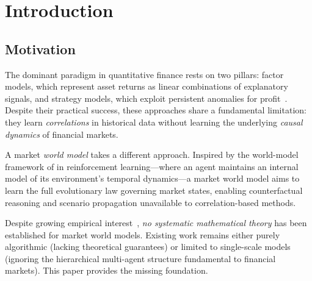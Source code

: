 \documentclass[12pt,a4paper]{article}
\theoremstyle{plain}
\theoremstyle{definition}
\newcommand{\1}{\mathbbm{1}}
\begin{document}
\begin{abstract}
Taken together, these results constitute, to the best of our knowledge,
the \emph{first} systematic mathematical theory for market world models—one
that is simultaneously axiomatically rigorous and computationally realizable:
a self-contained, axiomatically grounded framework that connects the
world-model paradigm of machine learning to the rigorous traditions of
stochastic analysis and mean-field game theory in quantitative finance.

\smallskip
\noindent\textbf{Keywords:} world model, mean-field game, stochastic
differential equation, Lévy process, groupoid, Lyapunov stability,
market microstructure, prediction lower bound.

\smallskip
\noindent\textbf{MSC 2020:} 91G99, 60G51, 49N80, 22A22, 60H10.
\end{abstract}

\tableofcontents

\section{Introduction}

\subsection{Motivation}

The dominant paradigm in quantitative finance rests on two pillars: factor
models, which represent asset returns as linear combinations of explanatory
signals, and strategy models, which exploit persistent anomalies for
profit~\citep{Fama1970,Ross1976}. Despite their practical success, these
approaches share a fundamental limitation: they learn \emph{correlations} in
historical data without learning the underlying \emph{causal dynamics} of
financial markets.

A market \emph{world model} takes a different approach. Inspired by
the world-model framework of \citet{HaSchmidhuber2018} in reinforcement
learning—where an agent maintains an internal model of its environment's
temporal dynamics—a market world model aims to learn the full evolutionary law
governing market states, enabling counterfactual reasoning and scenario
propagation unavailable to correlation-based methods.

Despite growing empirical interest~\citep{AwmlgLiverpool2026}, \emph{no
systematic mathematical theory} has been established for market world models.
Existing work remains either purely algorithmic (lacking theoretical
guarantees) or limited to single-scale models (ignoring the hierarchical
multi-agent structure fundamental to financial markets).
This paper provides the missing foundation.
\end{document}
